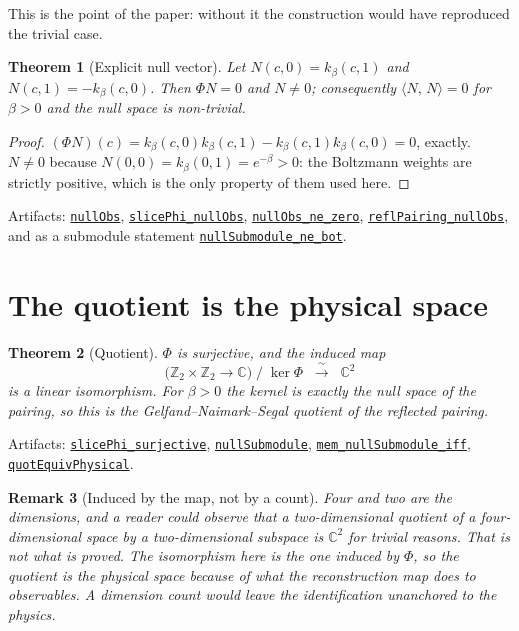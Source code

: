 \documentclass[11pt]{article}
\newtheorem{theorem}{Theorem}[section]
\newtheorem{remark}[theorem]{Remark}
\theoremstyle{definition}
\newcommand{\anchor}{673d1df122ac7110e6f7b52795b44a02d38d8d24}
\newcommand{\osline}[3]{%
  \href{https://github.com/lluiseriksson/THE-ERIKSSON-PROGRAMME/blob/\anchor/YangMills/OS/#1.lean\#L#2}{\nolinkurl{#3}}}
\newcommand{\C}{\mathbb{C}}
\newcommand{\Z}{\mathbb{Z}}
\newcommand{\inn}[2]{\langle #1,\, #2\rangle}
\begin{document}
This is the point of the paper: without it the construction would have
reproduced the trivial case.

\begin{theorem}[Explicit null vector]\label{thm:null}
Let $N(c,0) = k_\beta(c,1)$ and $N(c,1) = -k_\beta(c,0)$.  Then $\Phi N = 0$ and
$N \neq 0$; consequently $\inn{N}{N} = 0$ for $\beta > 0$ and the null space is
non-trivial.
\end{theorem}

\begin{proof}
$(\Phi N)(c) = k_\beta(c,0)k_\beta(c,1) - k_\beta(c,1)k_\beta(c,0) = 0$, exactly.
$N\neq 0$ because $N(0,0) = k_\beta(0,1) = e^{-\beta} > 0$: the Boltzmann weights
are strictly positive, which is the only property of them used here.
\end{proof}

Artifacts: \osline{Z2Quotient}{210}{nullObs},
\osline{Z2Quotient}{220}{slicePhi\_nullObs},
\osline{Z2Quotient}{229}{nullObs\_ne\_zero},
\osline{Z2Quotient}{235}{reflPairing\_nullObs}, and as a submodule statement
\osline{Z2Quotient}{273}{nullSubmodule\_ne\_bot}.

\section{The quotient is the physical space}

\begin{theorem}[Quotient]\label{thm:quot}
$\Phi$ is surjective, and the induced map
\[
  \bigl(\Z_2\times\Z_2 \to \C\bigr)\;/\;\ker\Phi \;\;\xrightarrow{\ \sim\ }\;\; \C^2
\]
is a linear isomorphism.  For $\beta>0$ the kernel is exactly the null space of
the pairing, so this is the Gelfand--Naimark--Segal quotient of the reflected
pairing.
\end{theorem}

Artifacts: \osline{Z2Quotient}{252}{slicePhi\_surjective},
\osline{Z2Quotient}{265}{nullSubmodule},
\osline{Z2Quotient}{268}{mem\_nullSubmodule\_iff},
\osline{Z2Quotient}{283}{quotEquivPhysical}.

\begin{remark}[Induced by the map, not by a count]
Four and two are the dimensions, and a reader could observe that a
two-dimensional quotient of a four-dimensional space by a two-dimensional
subspace is $\C^2$ for trivial reasons.  That is not what is proved.  The
isomorphism here is the one \emph{induced by $\Phi$}, so the quotient is the
physical space \emph{because of what the reconstruction map does to
observables}.  A dimension count would leave the identification unanchored to
the physics.
\end{remark}
\end{document}
